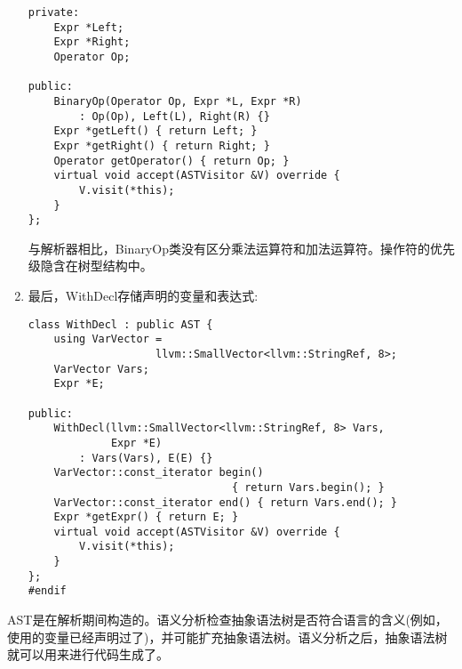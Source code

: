 \begin{enumerate}
\begin{lstlisting}[caption={}]
private:
	Expr *Left;
	Expr *Right;
	Operator Op;
	
public:
	BinaryOp(Operator Op, Expr *L, Expr *R)
		: Op(Op), Left(L), Right(R) {}
	Expr *getLeft() { return Left; }
	Expr *getRight() { return Right; }
	Operator getOperator() { return Op; }
	virtual void accept(ASTVisitor &V) override {
		V.visit(*this);
	}
};	
\end{lstlisting}
与解析器相比，BinaryOp类没有区分乘法运算符和加法运算符。操作符的优先级隐含在树型结构中。

\item 最后，WithDecl存储声明的变量和表达式:
\begin{lstlisting}[caption={}]
class WithDecl : public AST {
	using VarVector =
					llvm::SmallVector<llvm::StringRef, 8>;
	VarVector Vars;
	Expr *E;
	
public:
	WithDecl(llvm::SmallVector<llvm::StringRef, 8> Vars,
			 Expr *E)
		: Vars(Vars), E(E) {}
	VarVector::const_iterator begin()
								{ return Vars.begin(); }
	VarVector::const_iterator end() { return Vars.end(); }
	Expr *getExpr() { return E; }
	virtual void accept(ASTVisitor &V) override {
		V.visit(*this);
	}
};
#endif	
\end{lstlisting}

\end{enumerate}

AST是在解析期间构造的。语义分析检查抽象语法树是否符合语言的含义(例如，使用的变量已经声明过了)，并可能扩充抽象语法树。语义分析之后，抽象语法树就可以用来进行代码生成了。
